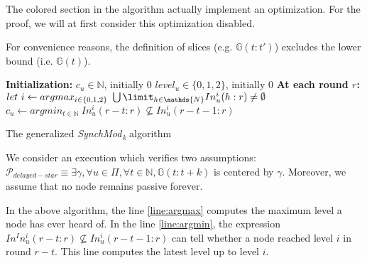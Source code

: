 \documentclass[11pt,letterpaper]{article}
\newcommand{\cent}{\gamma}
\newcommand{\SM}{{\em SynchMod}$_{\,k}\ $}
\begin{document}
The colored section in the algorithm actually implement an optimization.
For the proof, we will at first consider this optimization disabled.

For convenience reasons, the definition of slices (e.g. $\mathds{G}(t:t')$) excludes the lower bound (i.e. $\mathds{G}(t)$).

\begin{algorithm}[htb]
	\DontPrintSemicolon
	\textbf{Initialization:} \;
	\Indp
		$c_u \in \mathds{N}$, initially 0 \;
		$level_u \in \{0, 1, 2\}$, initially 0 \;
	\BlankLine
	\Indm
	\textbf{At each round $r$:} \;
	\Indp
		$let~i \leftarrow argmax_{i \in \{0, 1, 2\}}~\bigcup\limit_{h \in \mathds{N}} In_u^i(h:r) \neq \emptyset$ \;\label{line:argmax}
		$c_u \leftarrow argmin_{t \in \mathds{N}}~In_u^i(r-t:r) \nsubseteq In_u^i(r-t-1:r)$ \;\label{line:argmin} 
	\Indm
\caption{The generalized \SM algorithm} 
\end{algorithm}

We consider an execution which verifies two assumptions:
$\mathcal{P}_{delayed-star} \equiv \exists \cent, \forall u \in \Pi, \forall t \in \mathds{N}, \mathds{G}(t:t+k)$ is centered by $\cent$.
Moreover, we assume that no node remains passive forever.

In the above algorithm, the line \ref{line:argmax} computes the maximum level a node has ever heard of.
In the line \ref{line:argmin}, the expression $In^In_u^i(r-t:r) \nsubseteq In_u^i(r-t-1:r)$ can tell whether a node reached level $i$ in round $r-t$.
This line computes the latest level up to level $i$.
\end{document}
